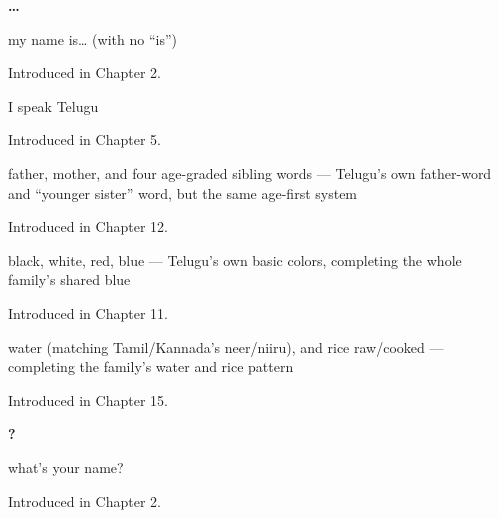 \noindent\begin{minipage}[t]{\linewidth}
\raggedright
\textbf{  …}\par
\small my name is… (with no \textquotedblleft{}is\textquotedblright{})\par
\footnotesize Introduced in Chapter 2.
\end{minipage}\par\medskip

\noindent\begin{minipage}[t]{\linewidth}
\raggedright
\textbf{  }\par
\small I speak Telugu\par
\footnotesize Introduced in Chapter 5.
\end{minipage}\par\medskip

\noindent\begin{minipage}[t]{\linewidth}
\raggedright
\textbf{     }\par
\small father, mother, and four age-graded sibling words — Telugu's own father-word and \textquotedblleft{}younger sister\textquotedblright{} word, but the same age-first system\par
\footnotesize Introduced in Chapter 12.
\end{minipage}\par\medskip

\noindent\begin{minipage}[t]{\linewidth}
\raggedright
\textbf{   }\par
\small black, white, red, blue — Telugu's own basic colors, completing the whole family's shared blue\par
\footnotesize Introduced in Chapter 11.
\end{minipage}\par\medskip

\noindent\begin{minipage}[t]{\linewidth}
\raggedright
\textbf{  }\par
\small water (matching Tamil/Kannada's neer/niiru), and rice raw/cooked — completing the family's water and rice pattern\par
\footnotesize Introduced in Chapter 15.
\end{minipage}\par\medskip

\noindent\begin{minipage}[t]{\linewidth}
\raggedright
\textbf{  ?}\par
\small what's your name?\par
\footnotesize Introduced in Chapter 2.
\end{minipage}\par\medskip

